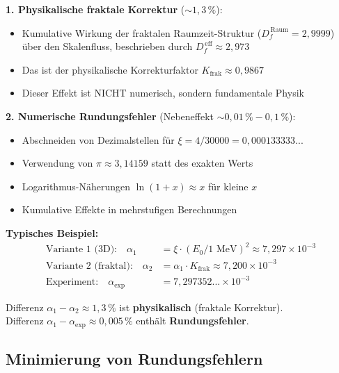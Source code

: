 	\begin{tcolorbox}[colback=green!5!white,colframe=green!75!black,title={Zwei Arten von Korrekturen in T0-Berechnungen}]
		\textbf{1. Physikalische fraktale Korrektur} ($\sim 1{,}3\,\%$):
		\begin{itemize}
			\item Kumulative Wirkung der fraktalen Raumzeit-Struktur ($D_f^{\,\text{Raum}} = 2{,}9999$) über den Skalenfluss, beschrieben durch $D_f^{\,\text{eff}} \approx 2{,}973$
			\item Das ist der physikalische Korrekturfaktor $K_{\text{frak}} \approx 0{,}9867$
			\item Dieser Effekt ist NICHT numerisch, sondern fundamentale Physik
		\end{itemize}
		
		\textbf{2. Numerische Rundungsfehler} (Nebeneffekt $\sim 0{,}01\,\% - 0{,}1\,\%$):
		\begin{itemize}
			\item Abschneiden von Dezimalstellen für $\xi = 4/30000 = 0{,}000133333...$
			\item Verwendung von $\pi \approx 3{,}14159$ statt des exakten Werts
			\item Logarithmus-Näherungen $\ln(1+x) \approx x$ für kleine $x$
			\item Kumulative Effekte in mehrstufigen Berechnungen
		\end{itemize}
		
		\textbf{Typisches Beispiel:}
		\begin{align}
			\text{Variante 1 (3D):} \quad \alpha_1 &= \xi \cdot (E_0/1\text{ MeV})^2 \approx 7{,}297 \times 10^{-3} \\
			\text{Variante 2 (fraktal):} \quad \alpha_2 &= \alpha_1 \cdot K_{\text{frak}} \approx 7{,}200 \times 10^{-3} \\
			\text{Experiment:} \quad \alpha_{\text{exp}} &= 7{,}297352... \times 10^{-3}
		\end{align}
		
		Differenz $\alpha_1 - \alpha_2 \approx 1{,}3\,\%$ ist \textbf{physikalisch} (fraktale Korrektur).\\
		Differenz $\alpha_1 - \alpha_{\text{exp}} \approx 0{,}005\,\%$ enthält \textbf{Rundungsfehler}.
	\end{tcolorbox}
	
	\subsection{Minimierung von Rundungsfehlern}
	
